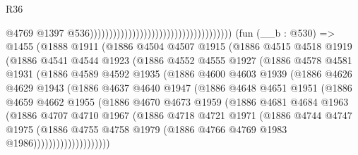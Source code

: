 \begin{lexlean}{R36}
\begin{coremodule}
                                                                              @4769
                                                                              @1397
                                                                              @536)))))))))))))))))))))))))))))))))))))
    (fun (__b : @530) =>
    @1455
      (@1888
        @1911
        (@1886
          @4504
          @4507
          @1915
          (@1886
            @4515
            @4518
            @1919
            (@1886
              @4541
              @4544
              @1923
              (@1886
                @4552
                @4555
                @1927
                (@1886
                  @4578
                  @4581
                  @1931
                  (@1886
                    @4589
                    @4592
                    @1935
                    (@1886
                      @4600
                      @4603
                      @1939
                      (@1886
                        @4626
                        @4629
                        @1943
                        (@1886
                          @4637
                          @4640
                          @1947
                          (@1886
                            @4648
                            @4651
                            @1951
                            (@1886
                              @4659
                              @4662
                              @1955
                              (@1886
                                @4670
                                @4673
                                @1959
                                (@1886
                                  @4681
                                  @4684
                                  @1963
                                  (@1886
                                    @4707
                                    @4710
                                    @1967
                                    (@1886
                                      @4718
                                      @4721
                                      @1971
                                      (@1886
                                        @4744
                                        @4747
                                        @1975
                                        (@1886
                                          @4755
                                          @4758
                                          @1979
                                          (@1886 @4766 @4769 @1983 @1986))))))))))))))))))))

\end{coremodule}
\end{lexlean}

